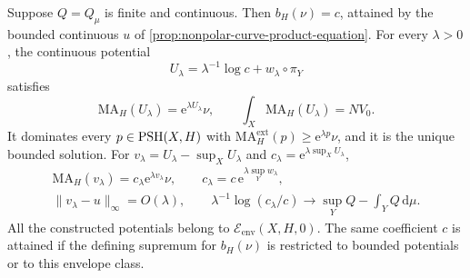 \begin{theorem}\label{thm:continuous-potential-product-threshold}
Suppose $Q=Q_\mu$ is finite and continuous. Then $b_H(\nu)=c$, attained by the bounded continuous $u$ of \cref{prop:nonpolar-curve-product-equation}. For every $\lambda>0$, the continuous potential
\[
 U_\lambda=\lambda^{-1}\log c+w_\lambda\circ\pi_Y
\]
satisfies
\[
 \mathrm{MA}_H(U_\lambda)=\mathrm e^{\lambda U_\lambda}\nu,
 \qquad \int_X\mathrm{MA}_H(U_\lambda)=NV_0.
\]
It dominates every $p\in\mathrm{PSH}(X,H)$ with $\mathrm{MA}^{\mathrm{ext}}_H(p)\geq\mathrm e^{\lambda p}\nu$, and it is the unique bounded solution. For $v_\lambda=U_\lambda-\sup_XU_\lambda$ and $c_\lambda=\mathrm e^{\lambda\sup_XU_\lambda}$,
\[
 \begin{gathered}
 \mathrm{MA}_H(v_\lambda)=c_\lambda\mathrm e^{\lambda v_\lambda}\nu,
 \qquad c_\lambda=c\,\mathrm e^{\lambda\sup_Yw_\lambda},\\
 \|v_\lambda-u\|_\infty=O(\lambda),\qquad
 \lambda^{-1}\log(c_\lambda/c)\longrightarrow\sup_YQ-\int_YQ\,\mathrm d\mu.
 \end{gathered}
\]
All the constructed potentials belong to $\mathcal E_{\mathrm{env}}(X,H,0)$. The same coefficient $c$ is attained if the defining supremum for $b_H(\nu)$ is restricted to bounded potentials or to this envelope class.
\end{theorem}
